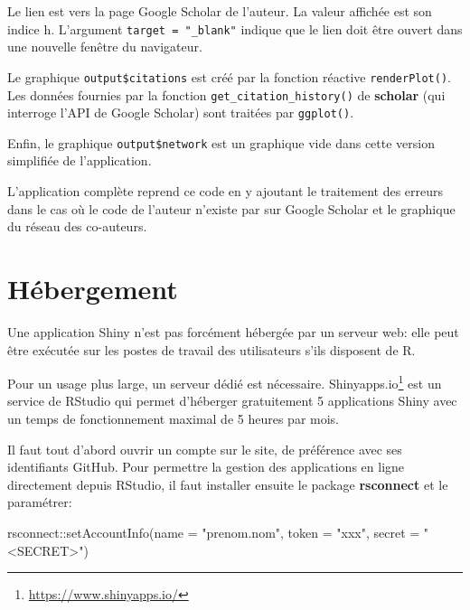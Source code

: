 \documentclass[
  11pt,
  french,
  a4paper,
  extrafontsizes,onecolumn,openright
  ]{memoir}
\newenvironment{Shaded}{\begin{snugshade}}{\end{snugshade}}
\newcommand{\AttributeTok}[1]{\textcolor[rgb]{0.77,0.63,0.00}{#1}}
\newcommand{\FunctionTok}[1]{\textcolor[rgb]{0.00,0.00,0.00}{#1}}
\newcommand{\NormalTok}[1]{#1}
\newcommand{\SpecialCharTok}[1]{\textcolor[rgb]{0.00,0.00,0.00}{#1}}
\newcommand{\StringTok}[1]{\textcolor[rgb]{0.31,0.60,0.02}{#1}}
\begin{document}
\normalsize

Le lien est vers la page Google Scholar de l'auteur.
La valeur affichée est son indice h.
L'argument \texttt{target\ =\ "\_blank"} indique que le lien doit être ouvert dans une nouvelle fenêtre du navigateur.

Le graphique \texttt{output\$citations} est créé par la fonction réactive \texttt{renderPlot()}.
Les données fournies par la fonction \texttt{get\_citation\_history()} de \textbf{scholar} (qui interroge l'API de Google Scholar) sont traitées par \texttt{ggplot()}.

Enfin, le graphique \texttt{output\$network} est un graphique vide dans cette version simplifiée de l'application.

L'application complète reprend ce code en y ajoutant le traitement des erreurs dans le cas où le code de l'auteur n'existe par sur Google Scholar et le graphique du réseau des co-auteurs.

\hypertarget{sec:hebergement-shiny}{%
\section{Hébergement}\label{sec:hebergement-shiny}}

Une application Shiny n'est pas forcément hébergée par un serveur web: elle peut être exécutée sur les postes de travail des utilisateurs s'ils disposent de R.

Pour un usage plus large, un serveur dédié est nécessaire.
Shinyapps.io\footnote{\url{https://www.shinyapps.io/}} est un service de RStudio qui permet d'héberger gratuitement 5 applications Shiny avec un temps de fonctionnement maximal de 5 heures par mois.

Il faut tout d'abord ouvrir un compte sur le site, de préférence avec ses identifiants GitHub.
Pour permettre la gestion des applications en ligne directement depuis RStudio, il faut installer ensuite le package \textbf{rsconnect} et le paramétrer:

\scriptsize

\begin{Shaded}
\begin{Highlighting}[]
\NormalTok{rsconnect}\SpecialCharTok{::}\FunctionTok{setAccountInfo}\NormalTok{(}\AttributeTok{name =} \StringTok{"prenom.nom"}\NormalTok{, }\AttributeTok{token =} \StringTok{"xxx"}\NormalTok{, }
    \AttributeTok{secret =} \StringTok{"\textless{}SECRET\textgreater{}"}\NormalTok{)}
\end{Highlighting}
\end{Shaded}
\end{document}
